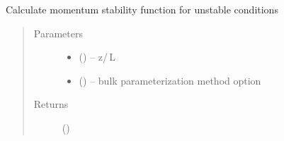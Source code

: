 \documentclass[letterpaper,10pt,english]{sphinxmanual}
\begin{document}

\begin{fulllineitems}
\label{\detokenize{index:flux_subs.psim_conv}}
Calculate momentum stability function for unstable conditions
\begin{quote}\begin{description}
\item[{Parameters}] \leavevmode\begin{itemize}
\item {} 
 (\href{https://docs.python.org/3/library/functions.html\#float}{}) -- z\slash\,L

\item {} 
 (\href{https://docs.python.org/3/library/stdtypes.html\#str}{}) -- bulk parameterization method option
\end{itemize}

\item[{Returns}] \leavevmode
{} (\href{https://docs.python.org/3/library/functions.html\#float}{})

\end{description}\end{quote}

\end{fulllineitems}

\end{document}
